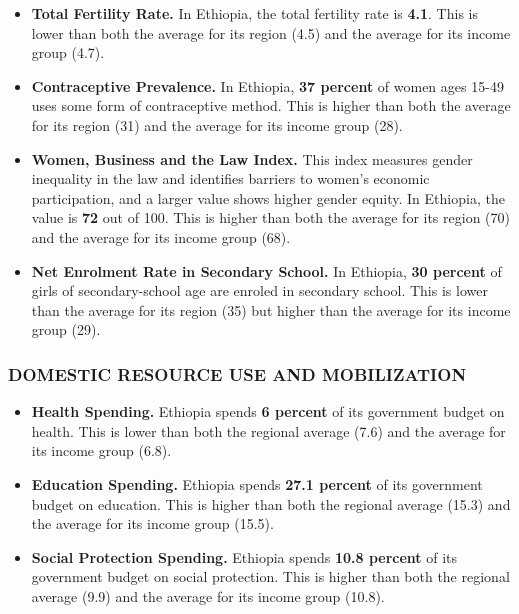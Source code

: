 \documentclass[9.2pt,twocolumn]{article}
\begin{document}
\begin{itemize}
\item
  \textbf{Total Fertility Rate.} In Ethiopia, the total fertility rate
  is \textbf{4.1}. This is lower than both the average for its region
  (4.5) and the average for its income group (4.7).
\item
  \textbf{Contraceptive Prevalence.} In Ethiopia, \textbf{37 percent} of
  women ages 15-49 uses some form of contraceptive method. This is
  higher than both the average for its region (31) and the average for
  its income group (28).
\item
  \textbf{Women, Business and the Law Index.} This index measures gender
  inequality in the law and identifies barriers to women's economic
  participation, and a larger value shows higher gender equity. In
  Ethiopia, the value is \textbf{72} out of 100. This is higher than
  both the average for its region (70) and the average for its income
  group (68).
\item
  \textbf{Net Enrolment Rate in Secondary School.} In Ethiopia,
  \textbf{30 percent} of girls of secondary-school age are enroled in
  secondary school. This is lower than the average for its region (35)
  but higher than the average for its income group (29).
\end{itemize}

\hypertarget{section-2}{%
\subsubsection{\texorpdfstring{\textcolor{bondiblue}{\textbf{D\small{OMESTIC RESOURCE USE AND MOBILIZATION}}}}{}}\label{section-2}}

\begin{itemize}
\item
  \textbf{Health Spending.} Ethiopia spends \textbf{6 percent} of its
  government budget on health. This is lower than both the regional
  average (7.6) and the average for its income group (6.8).
\item
  \textbf{Education Spending.} Ethiopia spends \textbf{27.1 percent} of
  its government budget on education. This is higher than both the
  regional average (15.3) and the average for its income group (15.5).
\item
  \textbf{Social Protection Spending.} Ethiopia spends \textbf{10.8
  percent} of its government budget on social protection. This is higher
  than both the regional average (9.9) and the average for its income
  group (10.8).
\end{itemize}
\end{document}
